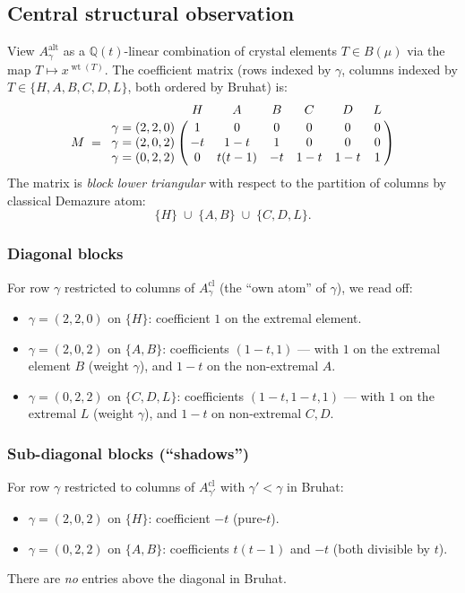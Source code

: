\documentclass[11pt]{article}
\theoremstyle{definition}
\newcommand{\wt}{\operatorname{wt}}
\newcommand{\Aalt}{A^{\mathrm{alt}}}
\begin{document}
\subsection*{Central structural observation}

View $\Aalt_\gamma$ as a $\mathbb{Q}(t)$-linear combination of crystal elements $T \in B(\mu)$ via the map $T \mapsto x^{\wt(T)}$. The coefficient matrix (rows indexed by $\gamma$, columns indexed by $T \in \{H,A,B,C,D,L\}$, both ordered by Bruhat) is:
\[
M \;=\;
\bordermatrix{
 & H & A & B & C & D & L \cr
\gamma=(2,2,0) & 1 & 0 & 0 & 0 & 0 & 0 \cr
\gamma=(2,0,2) & -t & 1-t & 1 & 0 & 0 & 0 \cr
\gamma=(0,2,2) & 0 & t(t-1) & -t & 1-t & 1-t & 1 \cr
}
\]
The matrix is \emph{block lower triangular} with respect to the partition of columns by classical Demazure atom:
\[
\{H\} \;\cup\; \{A,B\} \;\cup\; \{C,D,L\}.
\]

\subsubsection*{Diagonal blocks}

For row $\gamma$ restricted to columns of $A^{\mathrm{cl}}_\gamma$ (the ``own atom'' of $\gamma$), we read off:
\begin{itemize}
\item $\gamma=(2,2,0)$ on $\{H\}$: coefficient $1$ on the extremal element.
\item $\gamma=(2,0,2)$ on $\{A,B\}$: coefficients $(1-t, 1)$ --- with $1$ on the extremal element $B$ (weight $\gamma$), and $1-t$ on the non-extremal $A$.
\item $\gamma=(0,2,2)$ on $\{C,D,L\}$: coefficients $(1-t, 1-t, 1)$ --- with $1$ on the extremal $L$ (weight $\gamma$), and $1-t$ on non-extremal $C,D$.
\end{itemize}

\subsubsection*{Sub-diagonal blocks (``shadows'')}

For row $\gamma$ restricted to columns of $A^{\mathrm{cl}}_{\gamma'}$ with $\gamma' < \gamma$ in Bruhat:
\begin{itemize}
\item $\gamma=(2,0,2)$ on $\{H\}$: coefficient $-t$ (pure-$t$).
\item $\gamma=(0,2,2)$ on $\{A,B\}$: coefficients $t(t-1)$ and $-t$ (both divisible by $t$).
\end{itemize}
There are \emph{no} entries above the diagonal in Bruhat.
\end{document}
